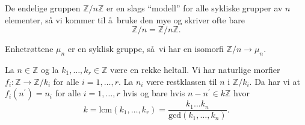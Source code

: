 \begin{remark}
    De endelige gruppen $\mathbb Z / n\mathbb Z$ er en slags ``modell''
    for alle sykliske grupper av $n$ elementer,
    så vi kommer til å bruke den mye og skriver ofte bare
    \[
        \mathbb Z / n = \mathbb Z / n\mathbb Z.
    \]
\end{remark}

\begin{example}
    Enhetrøttene $\mu_n$ er en syklisk gruppe,
    så vi har en isomorfi $\mathbb Z / n \to \mu_n$.
\end{example}

\begin{theorem}
    La $n\in \mathbb Z$ og la $k_1,\dots, k_r\in \mathbb Z$ være en rekke heltall.
    Vi har naturlige morfier $f_i\colon \mathbb Z\to \mathbb Z / k_i$
    for alle $i=1,\dots,r$.
    La $n_i$ være restklassen til $n$ i $\mathbb Z / k_i$.
    Da har vi at $f_i(n^\prime) = n_i$ for alle $i=1,\dots,r$
    hvis og bare hvis $n - n^\prime\in k\mathbb Z$ hvor
    \[
        k
        = \mathrm{lcm}(k_1,\dots,k_r)
        = \frac {k_1\dots k_n}{\mathrm{gcd}(k_1,\dots,k_n)}.
    \]
\end{theorem}
